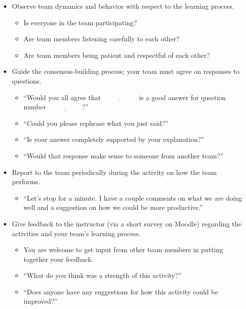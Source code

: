 \documentclass[12pt]{article}
\newcommand{\blank}{\ensuremath{\underline{\phantom{XXXXXX}}}\xspace}
\begin{document}
\begin{itemize}
\item Observe team dynamics and behavior with respect to the learning process.
  \begin{itemize}
  \item Is everyone in the team participating?
  \item Are team members listening carefully to each other?
  \item Are team members being patient and respectful of each other?
  \end{itemize}
\item Guide the consensus-building process; your team must agree on
  responses to questions.
  \begin{itemize}
  \item ``Would you all agree that \blank is a good answer for
    question number \blank?''
  \item ``Could you please rephrase what you just said?''
  \item ``Is your answer completely supported by your explanation?''
  \item ``Would that response make sense to someone from another
    team?''
  \end{itemize}
\item Report to the team periodically during the activity on how the
  team performs.
  \begin{itemize}
  \item ``Let's stop for a minute. I have a couple comments on what we
    are doing well and a suggestion on how we could be more
    productive.''
  \end{itemize}
\item Give feedback to the instructor (via a short survey on Moodle)
  regarding the activities and your team's learning process.
  \begin{itemize}
  \item You are welcome to get input from other team members in
    putting together your feedback.
  \item ``What do you think was a strength of this activity?''
  \item ``Does anyone have any suggestions for how this activity could
    be improved?''
  \end{itemize}
\end{itemize}
\end{document}
